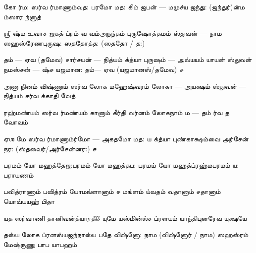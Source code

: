 \documentclass[10pt]{article}
\begin{document}
{%
\SlokaLarge
{கோ ர்ம: ஸர்வ ர்மாணாம்}{வத: பரமோ மத:}
{கிம் ஜபன் — மமுச்ய ஜந்து: (ஜந்துர்)}{ன்ம ம்ஸார ந்னாத்}

\SlokaHeaderLarge
{ஶ்ரீ ஷ்ம உவாச}
{ஜகத் ப்ரம் வ வம்}{அநந்தம் புருஷோத்தமம்}
{ஸ்துவன் — நாம ஸஹஸ்ரேண}{புருஷ: ஸததோத்த: (ஸததோ / த:)}

\newpage
\SlokaLarge
{தம் — ஏவ (தமேவ) சார்சயன் — நித்யம்} {க்த்யா புருஷம் — அவ்யயம்}
{யாயன் ஸ்துவன் நமஸ்சன் — ஷ்ச} {யஜமான: தம்— ஏவ (யஜமானஸ்/தமேவ) ச}

\SlokaLarge
{அனா நினம் விஷ்ணும்} {ஸர்வ லோக மஹேஷ்வரம்}
{லோகா — அயக்ஷம் ஸ்துவன் — நித்யம்} {சர்வ க்காதி வேத்}

\SlokaLarge
{ரஹ்மண்யம் ஸர்வ ர்மண்யம்} {கானாம் கீர்தி வர்னம்}
{லோகநாம் ம — தம்} {ர்வ த வோவம்}

\SlokaLarge
{ஏஶ மே ஸர்வ ர்மாணாம்}{ர்மோ — அகதமோ மத:}
{ய \dash {}க்த்யா புண்காக்ஷம்}{வை அர்சேன் நர: (ஸ்தவைர்/அர்சேன்னர:) ச}

\SlokaLarge
{பரமம் யோ மஹத்தேஜ:}{பரமம் யோ மஹத்தப:}
{பரமம் யோ மஹத்ப்ரஹ்ம}{பரமம் ய: பராயணம்}

\SlokaLarge
{பவித்ராணாம் பவித்ரம் யோ}{மங்ளானாம் ச மங்ளம்}
{ய்வதம் வதானாம் ச}{தானாம் யொவ்யயஹ் பிதா}

\SlokaLarge
{யத ஸர்வாணி தானி}{வன்த்யாy{தி}{3} யுமே}
{யஸ்மின்ஶ்ச ப்ரளயம் யாந்தி}{புனரேவ யுக்ஷயே}

\SlokaLarge
{தஸ்ய லோக ப்ரனஸ்ய}{ஜந்நாஸ்ய பதே}
{விஷ்னோ: \dash நாம (விஷ்னோர் / நாம) ஸஹஸ்ரம் மே}{ஷ்ருணு பாப யாபஹம்}

}
\end{document}

